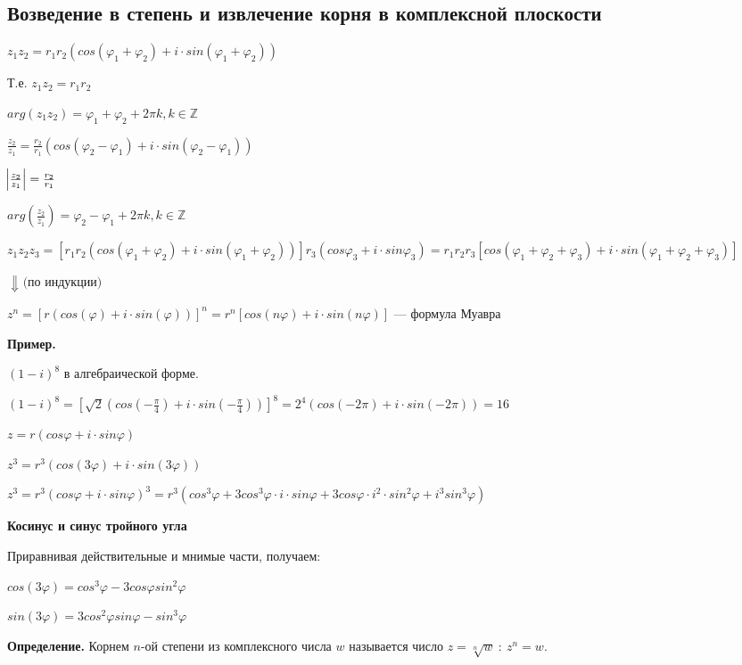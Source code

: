 \documentclass{article}
\begin{document}
    \subsection{Возведение в степень и извлечение корня в комплексной плоскости}

    \( z_1z_2 = r_1r_2(cos(\varphi_1 + \varphi_2) + i \cdot sin(\varphi_1 + \varphi_2)) \) 

    Т.е. \( z_1z_2 = r_1r_2 \)

    \( arg(z_1z_2) = \varphi_1 + \varphi_2 + 2\pi k, k \in \mathbb{Z} \) 

    \( \frac{z_2}{z_1} = \frac{r_2}{r_1}(cos(\varphi_2 - \varphi_1) + i\cdot sin(\varphi_2 - \varphi_1)) \)

    \( \abs{\frac{z_2}{z_1}} = \frac{r_2}{r_1} \)

    \( arg(\frac{z_2}{z_1}) = \varphi_2 - \varphi_1 + 2\pi k, k \in \mathbb{Z} \)
    
    \(z_1z_2z_3 = [r_1r_2(cos(\varphi_1+\varphi_2)+i\cdot sin(\varphi_1+\varphi_2))]r_3(cos\varphi_3+i\cdot sin\varphi_3) = r_1r_2r_3[cos(\varphi_1+\varphi_2+\varphi_3)+i\cdot sin(\varphi_1+\varphi_2+\varphi_3)]\)

    \( \Downarrow \textrm{ (по индукции)} \)

    \( z^n = [r(cos(\varphi) + i\cdot sin(\varphi))]^n = r^n[cos(n\varphi) + i\cdot sin(n\varphi)] \) --- формула Муавра
    
    \textbf{Пример.}

    \( (1 - i)^8 \) в алгебраической форме.

    \( (1 - i)^8 = [\sqrt{2}(cos(-\frac{\pi}{4}) + i\cdot sin(-\frac{\pi}{4}))]^8 = 2^4(cos(-2\pi) + i \cdot sin(-2\pi)) = 16 \)

    \( z = r(cos\varphi + i \cdot sin\varphi) \)

    \( z^3 = r^3(cos(3\varphi) + i \cdot sin(3\varphi)) \)

    \( z^3 = r^3(cos\varphi + i\cdot sin\varphi)^3 = r^3(cos^3\varphi + 3cos^3\varphi\cdot i\cdot sin\varphi + 3cos\varphi\cdot i^2\cdot sin^2\varphi + i^3 sin^3\varphi) \)

    \textbf{Косинус и синус тройного угла}

    Приравнивая действительные и мнимые части, получаем:

    \( cos(3\varphi) = cos^3\varphi - 3cos\varphi sin^2\varphi \)

    \( sin(3\varphi) = 3cos^2\varphi sin\varphi - sin^3\varphi \)
    
    \textbf{Определение.} Корнем \(n\)-ой степени из комплексного числа \(w\) называется число \(z = \sqrt[n]{w}\ :\ z^n = w\).
\end{document}
